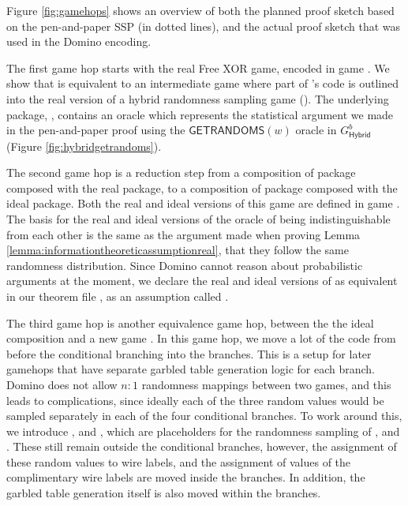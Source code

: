 Figure \ref{fig:gamehops} shows an overview of both the planned proof sketch based on the pen-and-paper SSP (in dotted lines), and the actual proof sketch that was used in the Domino encoding.



The first game hop starts with the real Free XOR game, encoded in game  . We show that  is equivalent to an intermediate game where part of 's code is outlined into the real version of a hybrid randomness sampling game (). The underlying package, , contains an oracle  which represents the statistical argument we made in the pen-and-paper proof using the $\mathsf{GETRANDOMS\mathit{(w)}}$ oracle in $G^b_\mathsf{Hybrid}$ (Figure \ref{fig:hybridgetrandoms}). 

The second game hop is a reduction step from a composition of package  composed with the real  package, to a composition of package  composed with the ideal  package. Both the real and ideal versions of this game are defined in game . The basis for the real and ideal versions of the  oracle of  being indistinguishable from each other is the same as the argument made when proving Lemma \ref{lemma:informationtheoreticassumptionreal}, that they follow the same randomness distribution. Since Domino cannot reason about probabilistic arguments at the moment, we declare the real and ideal versions of  as equivalent in our theorem file , as an assumption called . 

The third game hop is another equivalence game hop, between the the ideal composition  and a new game . In this game hop, we move a lot of the code from before the conditional branching into the branches. This is a setup for later gamehops that have separate garbled table generation logic for each branch. Domino does not allow $n:1$ randomness mappings between two games, and this leads to complications, since ideally each of the three random values would be sampled separately in each of the four conditional branches. To work around this, we introduce ,  and , which are placeholders for the randomness sampling of ,  and . These still remain outside the conditional branches, however, the assignment of these random values to wire labels, and the assignment of values of the complimentary wire labels are moved inside the branches. In addition, the garbled table generation itself is also moved within the branches.

